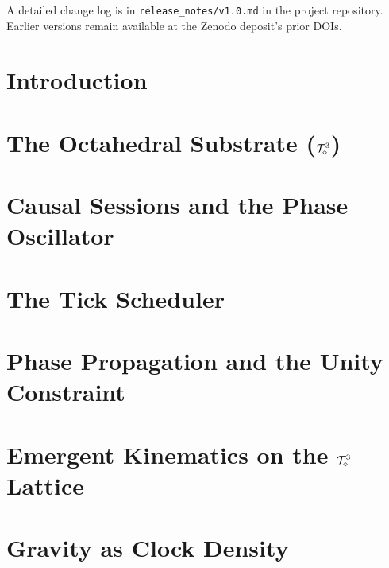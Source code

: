 \documentclass[12pt, letterpaper]{article}
\begin{document}
A detailed change log is in
\texttt{release\_notes/v1.0.md} in the project repository.
Earlier versions remain available at the Zenodo deposit's prior
DOIs.

\newpage
\tableofcontents
\newpage

\section{Introduction}


\section{The Octahedral Substrate \texorpdfstring{($\mathcal{T}_\diamond^3$)}{(T\_diamond\textasciicircum 3)}}


\section{Causal Sessions and the Phase Oscillator}


\section{The Tick Scheduler}


\section{Phase Propagation and the Unity Constraint}


\section{Emergent Kinematics on the \texorpdfstring{$\mathcal{T}_\diamond^3$}{T\_diamond\textasciicircum 3} Lattice}


\section{Gravity as Clock Density}

\end{document}

